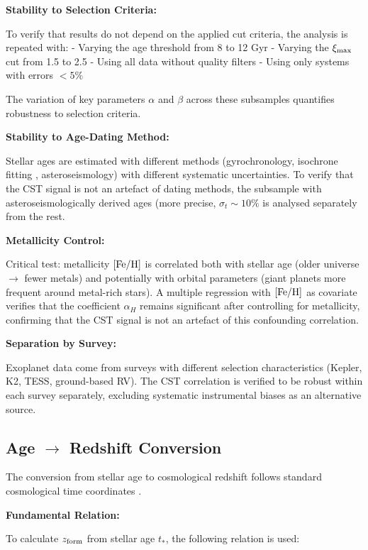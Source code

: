 \documentclass[10pt,a4paper]{article}
\begin{document}
\textbf{Stability to Selection Criteria:}

To verify that results do not depend on the applied cut criteria, the
analysis is repeated with: - Varying the age threshold from 8 to 12 Gyr
- Varying the \(\xi_{\rm max}\) cut from 1.5 to 2.5 - Using all data
without quality filters - Using only systems with errors \(< 5\%\)

The variation of key parameters \(\alpha\) and \(\beta\) across these
subsamples quantifies robustness to selection criteria.

\textbf{Stability to Age-Dating Method:}

Stellar ages are estimated with different methods (gyrochronology,
isochrone fitting \cite{Dotter2017}, asteroseismology) with different systematic
uncertainties. To verify that the CST signal is not an artefact of
dating methods, the subsample with asteroseismologically derived ages
(more precise, \(\sigma_t \sim 10\%\) is analysed separately from the
rest.

\textbf{Metallicity Control:}

Critical test: metallicity \([{\rm Fe/H}]\) is correlated both with
stellar age (older universe $\rightarrow$ fewer metals) and potentially with orbital
parameters (giant planets more frequent around metal-rich stars). A
multiple regression with \([{\rm Fe/H}]\) as covariate verifies that the
coefficient \(\alpha_H\) remains significant after controlling for
metallicity, confirming that the CST signal is not an artefact of this
confounding correlation.

\textbf{Separation by Survey:}

Exoplanet data come from surveys with different selection
characteristics (Kepler, K2, TESS, ground-based RV). The CST correlation
is verified to be robust within each survey separately, excluding
systematic instrumental biases as an alternative source.

\subsection{Age $\rightarrow$ Redshift
Conversion}\label{age-redshift-conversion}

The conversion from stellar age to cosmological redshift follows standard cosmological time coordinates \cite{ref25}.

\textbf{Fundamental Relation:}

To calculate \(z_{\rm form}\) from stellar age \(t_*\), the following
relation is used:
\end{document}
